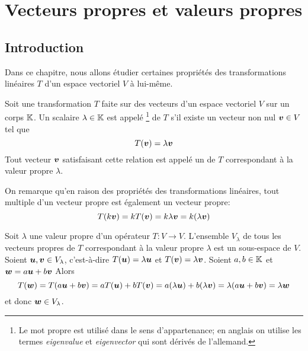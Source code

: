\chapter{Vecteurs propres et valeurs propres}

\section{Introduction}
Dans ce chapitre, nous allons étudier certaines propriétés des transformations
linéaires $T$ d'un espace vectoriel $V$ à lui-même.  

\begin{defini}
Soit une transformation $T$ faite sur des vecteurs d'un espace vectoriel $V$ sur un corps $\mathbb{K}$.
Un scalaire $\lambda \in \mathbb{K}$ est appelé \footnote{
Le mot propre est utilisé dans le sens d'appartenance; en anglais on utilise les termes \textit{eigenvalue} et
\textit{eigenvector} qui sont dérivés de l'allemand.} de $T$ s'il existe un
vecteur non nul $\boldsymbol{v}\in V$ tel que
\[
T(\boldsymbol{v}) = \lambda \boldsymbol{v}
\]
Tout vecteur $\boldsymbol{v}$ satisfaisant cette relation est appelé un  de $T$
correspondant à la valeur propre $\lambda$.
\end{defini}
On remarque qu'en raison des propriétés des transformations linéaires, tout
multiple d'un vecteur propre est également un vecteur propre:
\[
T(k\boldsymbol{v}) = k T(\boldsymbol{v}) = k\lambda \boldsymbol{v} = k(\lambda\boldsymbol{v})
\]
\begin{theo}
Soit $\lambda$ une valeur propre d'un opérateur $T: V \rightarrow V$.  L'ensemble $V_\lambda$ de
tous les vecteurs propres de $T$ correspondant à la valeur propre $\lambda$ est un
sous-espace de $V$.
\proof
Soient $\boldsymbol{u}, \boldsymbol{v} \in V_\lambda$, c'est-à-dire $T(\boldsymbol{u}) = \lambda\boldsymbol{u}$ et 
 $T(\boldsymbol{v}) = \lambda\boldsymbol{v}$. Soient $a, b \in \mathbb{K}$ et $\boldsymbol{w} = a\boldsymbol{u} + b\boldsymbol{v}$ Alors
 \[
T(\boldsymbol{w}) = T(a\boldsymbol{u} + b\boldsymbol{v}) = aT(\boldsymbol{u}) + bT(\boldsymbol{v}) = a(\lambda\boldsymbol{u}) + b(\lambda\boldsymbol{v}) = \lambda(a\boldsymbol{u} + b\boldsymbol{v}) =\lambda\boldsymbol{w}
 \]
 et donc $\boldsymbol{w} \in V_\lambda$.
\end{theo}

